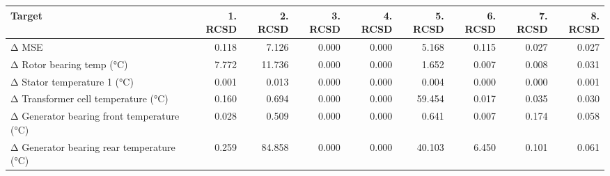 \begin{tabular}{lrrrrrrrr}
\toprule
Target & 1. RCSD & 2. RCSD & 3. RCSD & 4. RCSD & 5. RCSD & 6. RCSD & 7. RCSD & 8. RCSD \\
\midrule
Δ MSE & 0.118 & 7.126 & 0.000 & 0.000 & 5.168 & 0.115 & 0.027 & 0.027 \\
Δ Rotor bearing temp (°C) & 7.772 & 11.736 & 0.000 & 0.000 & 1.652 & 0.007 & 0.008 & 0.031 \\
Δ Stator temperature 1 (°C) & 0.001 & 0.013 & 0.000 & 0.000 & 0.004 & 0.000 & 0.000 & 0.001 \\
Δ Transformer cell temperature (°C) & 0.160 & 0.694 & 0.000 & 0.000 & 59.454 & 0.017 & 0.035 & 0.030 \\
Δ Generator bearing front temperature (°C) & 0.028 & 0.509 & 0.000 & 0.000 & 0.641 & 0.007 & 0.174 & 0.058 \\
Δ Generator bearing rear temperature (°C) & 0.259 & 84.858 & 0.000 & 0.000 & 40.103 & 6.450 & 0.101 & 0.061 \\
\bottomrule
\end{tabular}
